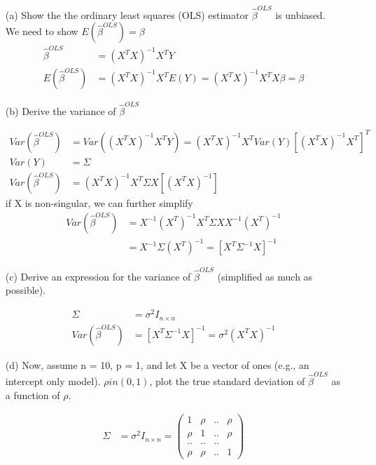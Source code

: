 \begin{itemize}
	\item [(a)] Show the the ordinary least squares (OLS) estimator $\hat{\beta}^{OLS}$ is unbiased.
	We need to show $E(\hat{\beta}^{OLS}) = \beta$
\begin{align*}
	\hat{\beta}^{OLS} &=  (X^T X)^{-1}X^T Y \\
	E(\hat{\beta}^{OLS}) &= (X^T X)^{-1}X^T E(Y) =  (X^T X)^{-1}X^T X \beta = \beta
\end{align*}	
	
	\item[(b)] Derive the variance of $\hat{\beta}^{OLS}$ 
	
\begin{align*}
	Var(\hat{\beta}^{OLS}) &= Var((X^T X)^{-1}X^T Y )= (X^T X)^{-1}X^T Var(Y) [(X^T X)^{-1}X^T ]^T \\
	Var(Y) &= \Sigma \\
	Var(\hat{\beta}^{OLS})  & =  (X^T X)^{-1}X^T \Sigma X [(X^T X)^{-1}] 
\end{align*}		
	if X is non-singular, we can further simplify 
\begin{align*}	
	Var(\hat{\beta}^{OLS})	&= X^{-1} (X^T)^{-1} X^T \Sigma X X^{-1} (X^T)^{-1} \\
	&= X^{-1} \Sigma (X^T)^{-1} = [X^T \Sigma^{-1} X]^{-1}
\end{align*}		
	
	\item[(c)] Derive an expression for the variance of $\hat{\beta}^{OLS}$ (simplified as much as possible).
	
	\begin{align*}
	\Sigma &= \sigma^2 I_{n \times n} \\
	Var(\hat{\beta}^{OLS}) &= [X^T \Sigma^{-1} X]^{-1} = \sigma^2 (X^T X)^{-1}
\end{align*}

\item[(d)] Now, assume n = 10, p = 1, and let X be a vector of ones (e.g., an intercept only model). $\rho in (0,1)$, plot the true standard deviation of $\hat{\beta}^{OLS}$ as a function of $\rho$.

\begin{align*}
	\Sigma &= \sigma^2 I_{n \times n} = \begin{pmatrix}
	1 & \rho &.. & \rho \\
	\rho & 1 &.. & \rho\\
	.. &.. & ..& \\
	\rho & \rho &. .& 1  
	\end{pmatrix}
\end{align*}


\end{itemize}
